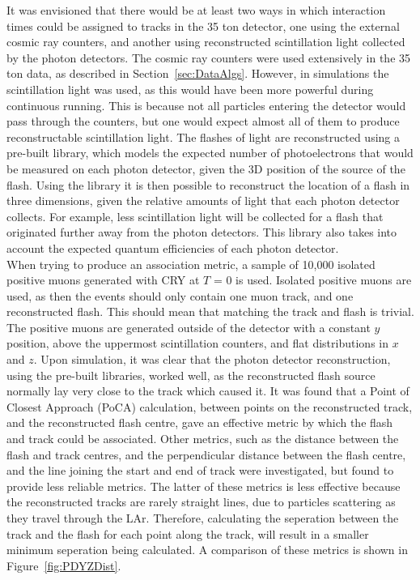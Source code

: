 It was envisioned that there would be at least two ways in which interaction times could be assigned to tracks in the 35 ton detector, one using the external cosmic ray counters, and another using reconstructed scintillation light collected by the photon detectors. The cosmic ray counters were used extensively in the 35 ton data, as described in Section~\ref{sec:DataAlgs}. However, in simulations the scintillation light was used, as this would have been more powerful during continuous running. This is because not all particles entering the detector would pass through the counters, but one would expect almost all of them to produce reconstructable scintillation light. The flashes of light are reconstructed using a pre-built library, which models the expected number of photoelectrons that would be measured on each photon detector, given the 3D position of the source of the flash. Using the library it is then possible to reconstruct the location of a flash in three dimensions, given the relative amounts of light that each photon detector collects. For example, less scintillation light will be collected for a flash that originated further away from the photon detectors. This library also takes into account the expected quantum efficiencies of each photon detector. \\

When trying to produce an association metric, a sample of 10,000 isolated positive muons generated with CRY at $T$ = 0 is used. Isolated positive muons are used, as then the events should only contain one muon track, and one reconstructed flash. This should mean that matching the track and flash is trivial. The positive muons are generated outside of the detector with a constant $y$ position, above the uppermost scintillation counters, and flat distributions in $x$ and $z$. Upon simulation, it was clear that the photon detector reconstruction, using the pre-built libraries, worked well, as the reconstructed flash source normally lay very close to the track which caused it. It was found that a Point of Closest Approach (PoCA) calculation, between points on the reconstructed track, and the reconstructed flash centre, gave an effective metric by which the flash and track could be associated. Other metrics, such as the distance between the flash and track centres, and the perpendicular distance between the flash centre, and the line joining the start and end of track were investigated, but found to provide less reliable metrics. The latter of these metrics is less effective because the reconstructed tracks are rarely straight lines, due to particles scattering as they travel through the LAr. Therefore, calculating the seperation between the track and the flash for each point along the track, will result in a smaller minimum seperation being calculated. A comparison of these metrics is shown in Figure~\ref{fig:PDYZDist}. \\

